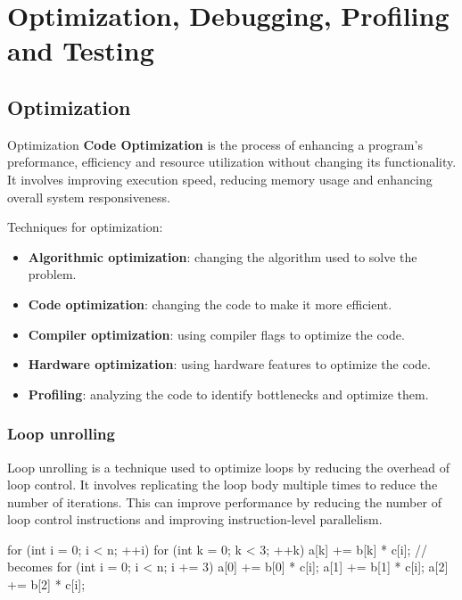 
\chapter{Optimization, Debugging, Profiling and Testing}

\section{Optimization}

\begin{definitionblock}{Optimization}
    \textbf{Code Optimization} is the process of enhancing a program's preformance, efficiency and resource utilization without changing its functionality. It involves improving execution speed, reducing memory usage and enhancing overall system responsiveness.
\end{definitionblock}

Techniques for optimization:
\begin{itemize}
    \item \textbf{Algorithmic optimization}: changing the algorithm used to solve the problem.
    \item \textbf{Code optimization}: changing the code to make it more efficient.
    \item \textbf{Compiler optimization}: using compiler flags to optimize the code.
    \item \textbf{Hardware optimization}: using hardware features to optimize the code.
    \item \textbf{Profiling}: analyzing the code to identify bottlenecks and optimize them.
\end{itemize}

\subsection*{Loop unrolling}

Loop unrolling is a technique used to optimize loops by reducing the overhead of loop control. It involves replicating the loop body multiple times to reduce the number of iterations. This can improve performance by reducing the number of loop control instructions and improving instruction-level parallelism.

\begin{codeblock}[language=c++]
    for (int i = 0; i < n; ++i) {
        for (int k = 0; k < 3; ++k) {
            a[k] += b[k] * c[i];
        }
    }
    // becomes
    for (int i = 0; i < n; i += 3) {
        a[0] += b[0] * c[i];
        a[1] += b[1] * c[i];
        a[2] += b[2] * c[i];
    }
\end{codeblock}

